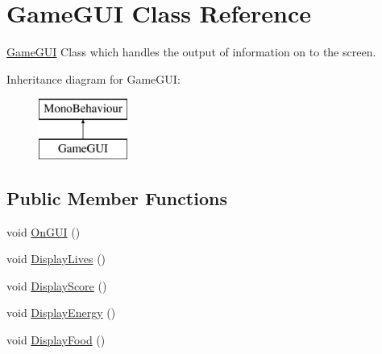 \hypertarget{class_game_g_u_i}{\section{Game\-G\-U\-I Class Reference}
\label{class_game_g_u_i}
}


\hyperlink{class_game_g_u_i}{Game\-G\-U\-I} Class which handles the output of information on to the screen.  


Inheritance diagram for Game\-G\-U\-I\-:\begin{figure}[H]
\begin{center}
\leavevmode
\includegraphics[height=2.000000cm]{class_game_g_u_i}
\end{center}
\end{figure}
\subsection*{Public Member Functions}
\begin{DoxyCompactItemize}
\item 
void \hyperlink{class_game_g_u_i_a4f8ad6b9ce7ee951f37040fd61db1b69}{On\-G\-U\-I} ()
\item 
void \hyperlink{class_game_g_u_i_ac3c4ab5a0ccfc69d11a49facecac4c51}{Display\-Lives} ()
\item 
void \hyperlink{class_game_g_u_i_a606f8e772f115a28153ce64b37ebb6c8}{Display\-Score} ()
\item 
void \hyperlink{class_game_g_u_i_ab5bb66d0d6682838a841a8b3c7313938}{Display\-Energy} ()
\item 
void \hyperlink{class_game_g_u_i_a14527917f7d70ca7863fc41369f87002}{Display\-Food} ()
\end{DoxyCompactItemize}
